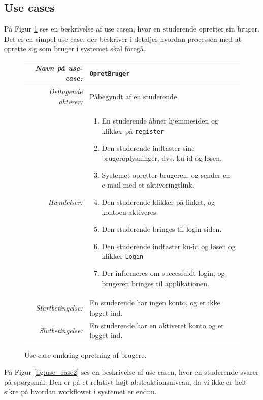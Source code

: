 \documentclass[12pt]{article}
\begin{document}
\subsection{Use cases}
\label{sub:use_cases}
På Figur \ref{fig:use_case1} ses en beskrivelse af use casen, hvor en studerende opretter sin bruger. Det er en simpel use case, der beskriver i detaljer hvordan processen med at oprette sig som bruger i systemet skal foregå.

\begin{figure}[htpb]
    \centering
    \begin{tabular}{r p{10cm}}
        \toprule
        \textit{Navn på use-case:} & \verb!OpretBruger! \\
        \hline
        \textit{Deltagende aktører:} & Påbegyndt af en studerende \\
        \hline
        \textit{Hændelser:} & \begin{enumerate}[nolistsep]
            \item En studerende åbner hjemmesiden og klikker på \verb!register!
            \item Den studerende indtaster sine brugeroplysninger, dvs. ku-id og løsen.
            \item Systemet opretter brugeren, og sender en e-mail med et aktiveringslink.
            \item Den studerende klikker på linket, og kontoen aktiveres.
            \item Den studerende bringes til login-siden.
            \item Den studerende indtaster ku-id og løsen og klikker \verb!Login!
            \item Der informeres om succesfuldt login, og brugeren bringes til applikationen.
        \end{enumerate}  \\
        \hline
        \textit{Startbetingelse:} & En studerende har ingen konto, og er ikke logget ind. \\
        \hline
        \textit{Slutbetingelse:} & En studerende har en aktiveret konto og er logget ind. \\
        \bottomrule
    \end{tabular}
    \caption{Use case omkring opretning af brugere.}
    \label{fig:use_case1}
\end{figure}

På Figur \ref{fig:use_case2} ses en beskrivelse af use casen, hvor en studerende svarer på spørgsmål. Den er på et relativt højt abstraktionsniveau, da vi ikke er helt sikre på hvordan workflowet i systemet er endnu.
\end{document}
